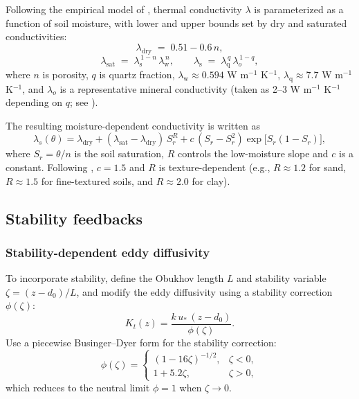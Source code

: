 \documentclass{article}
\begin{document}
    Following the empirical model of \citet{xiong2023new}, thermal conductivity $\lambda$ is parameterized as a function of soil moisture, with lower and upper bounds set by dry and saturated conductivities:
    \begin{equation}
    \lambda_{\mathrm{dry}} \;=\; 0.51 - 0.6\,n,
    \end{equation}
    \begin{equation}
    \lambda_{\mathrm{sat}} \;=\; \lambda_{\mathrm{s}}^{\,1-n}\,\lambda_{\mathrm{w}}^{\,n},
    \qquad
    \lambda_{\mathrm{s}} \;=\; \lambda_{\mathrm{q}}^{\,q}\,\lambda_{o}^{\,1-q},
    \end{equation}
    where $n$ is porosity, $q$ is quartz fraction, $\lambda_{\mathrm{w}} \approx 0.594$ W m$^{-1}$ K$^{-1}$, $\lambda_{\mathrm{q}} \approx 7.7$ W m$^{-1}$ K$^{-1}$, and $\lambda_{o}$ is a representative mineral
    conductivity (taken as 2--3 W m$^{-1}$ K$^{-1}$ depending on $q$; see \citet{xiong2023new}).

    The resulting moisture-dependent conductivity is written as
    \begin{equation}
    \label{eq:lambda_xiong}
    \lambda_s(\theta)
    =\lambda_{\mathrm{dry}}
    +(\lambda_{\mathrm{sat}}-\lambda_{\mathrm{dry}})\,S_r^{R}
    +c\,(S_r-S_r^2)\exp\!\bigl[S_r(1-S_r)\bigr],
    \end{equation}
    where $S_r = {\theta}/{n}$ is the soil saturation, 
    $R$ controls the low-moisture slope and $c$ is a constant. Following \citet{xiong2023new}, $c = 1.5$  and $R$ is texture-dependent (e.g., $R\approx 1.2$ for sand, $R\approx 1.5$ for fine-textured soils, and $R\approx 2.0$ for clay).

    
    \subsection*{Stability feedbacks}

    \subsubsection*{Stability-dependent eddy diffusivity}

    To incorporate stability,  define the Obukhov length $L$ and stability variable $\zeta=(z-d_0)/L$, and modify the eddy diffusivity using a stability correction $\phi(\zeta)$:
    \begin{equation}
    K_t(z)=\frac{k\,u_*\,(z-d_0)}{\phi(\zeta)}.
    \end{equation}
    Use a piecewise Businger--Dyer form for the stability correction:
    \begin{equation}
    \phi(\zeta)=
    \begin{cases}
    (1-16\zeta)^{-1/2}, & \zeta<0,\\[4pt]
    1+5.2\zeta, & \zeta>0,
    \end{cases}
    \end{equation}
    which reduces to the neutral limit $\phi=1$ when $\zeta\to 0$.
\end{document}
